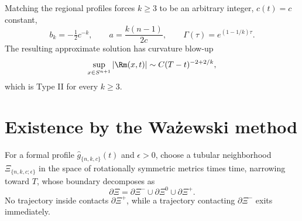 \begin{proposition}
\label{prop:chow-iv-matched-parameters}
Matching the regional profiles forces $k\ge3$ to be an arbitrary integer,
$c(t)=c$ constant,
\[
 b_k=-\tfrac12c^{-k},\qquad a=\frac{k(n-1)}{2c},
 \qquad \Gamma(\tau)=e^{(1-1/k)\tau}.
\]
The resulting approximate solution has curvature blow-up
\[
 \sup_{x\in S^{n+1}}|\Rm(x,t)|\sim C(T-t)^{-2+2/k},
\]
which is Type II for every $k\ge3$.
\end{proposition}

\section{Existence by the Ważewski method}

\begin{definition}
\label{def:chow-iv-wazewski-tubular-neighborhood}
For a formal profile $\widehat g_{\{n,k,c\}}(t)$ and $\epsilon>0$, choose a
tubular neighborhood $\Xi_{\{n,k,c;\epsilon\}}$ in the space of rotationally
symmetric metrics times time, narrowing toward $T$, whose boundary decomposes
as
\[
 \partial\Xi=\partial\Xi^-\cup\partial\Xi^0\cup\partial\Xi^+.
\]
No trajectory inside contacts $\partial\Xi^+$, while a trajectory contacting
$\partial\Xi^-$ exits immediately.
\end{definition}

